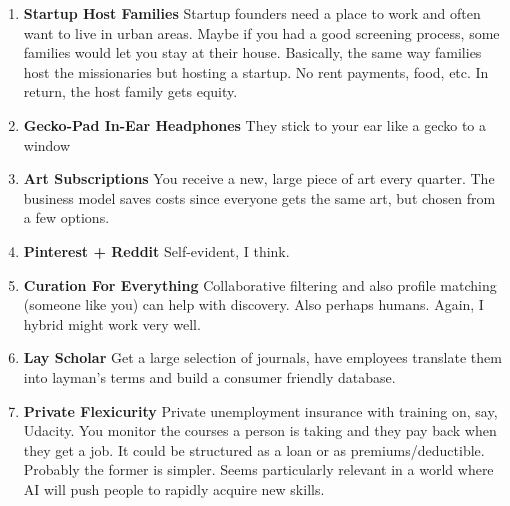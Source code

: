 \documentclass[paper=a4, fontsize=11pt]{scrartcl} %
\numberwithin{equation}{section} %
\numberwithin{figure}{section} %
\numberwithin{table}{section} %
\begin{document}
\begin{enumerate}
\item \textbf{Startup Host Families}  Startup founders need a place to work and often want to live in urban areas.  Maybe if you had a good screening process, some families
would let you stay at their house.  Basically, the same way families host the missionaries but hosting a startup.  No rent payments, food, etc.  In return, the host family gets equity.

\item \textbf{Gecko-Pad In-Ear Headphones} They stick to your ear like a gecko to a window

\item \textbf{Art Subscriptions} You receive a new, large piece of art every quarter.  The business model saves costs since everyone gets the same art, but chosen from a few options. 

\item \textbf{Pinterest + Reddit} Self-evident, I think.

\item \textbf{Curation For Everything} Collaborative filtering and also profile matching (someone like you) can help with discovery.  Also perhaps humans.  Again, I hybrid might work very well.  

\item \textbf{Lay Scholar} Get a large selection of journals, have employees translate them into layman's terms and build a consumer friendly database.  

\item \textbf{Private Flexicurity} Private unemployment insurance with training on, say, Udacity.  You monitor the courses a person is taking and they pay back when they get a job.  It could be structured as a loan or as premiums/deductible.  Probably the former is simpler.  Seems particularly relevant in a world where AI will push people to rapidly acquire new skills.

\end{enumerate}




%
%
%
\end{document}
